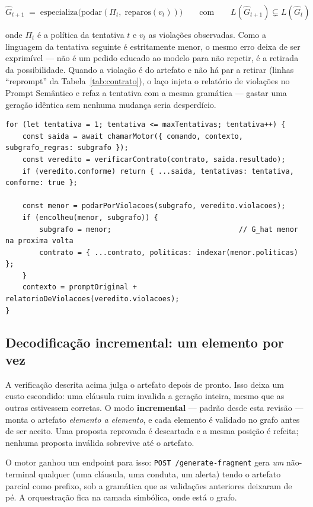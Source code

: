 \documentclass[11pt,a4paper]{article}
\begin{document}
\begin{equation*}
\hat{G}_{t+1} \;=\; \text{especializa}\bigl(\text{podar}(\Pi_t,\; \text{reparos}(v_t))\bigr)
\qquad\text{com}\qquad L(\hat{G}_{t+1}) \subsetneq L(\hat{G}_t)
\end{equation*}

onde $\Pi_t$ é a política da tentativa $t$ e $v_t$ as violações observadas. Como
a linguagem da tentativa seguinte é estritamente menor, o mesmo erro deixa de
ser exprimível --- não é um pedido educado ao modelo para não repetir, é a
retirada da possibilidade. Quando a violação é do artefato e não há par a
retirar (linhas ``reprompt'' da Tabela~\ref{tab:contrato}), o laço injeta o
relatório de violações no Prompt Semântico e refaz a tentativa com a mesma
gramática --- gastar uma geração idêntica sem nenhuma mudança seria desperdício.

\begin{lstlisting}[language=tsx,caption={Núcleo do laço (simplificado).}]
for (let tentativa = 1; tentativa <= maxTentativas; tentativa++) {
    const saida = await chamarMotor({ comando, contexto, subgrafo_regras: subgrafo });
    const veredito = verificarContrato(contrato, saida.resultado);
    if (veredito.conforme) return { ...saida, tentativas: tentativa, conforme: true };

    const menor = podarPorViolacoes(subgrafo, veredito.violacoes);
    if (encolheu(menor, subgrafo)) {
        subgrafo = menor;                              // G_hat menor na proxima volta
        contrato = { ...contrato, politicas: indexar(menor.politicas) };
    }
    contexto = promptOriginal + relatorioDeViolacoes(veredito.violacoes);
}
\end{lstlisting}

\subsection{Decodificação incremental: um elemento por vez}
\label{sec:incremental}

A verificação descrita acima julga o artefato depois de pronto. Isso deixa um
custo escondido: uma cláusula ruim invalida a geração inteira, mesmo que as
outras estivessem corretas. O modo \textbf{incremental} --- padrão desde esta
revisão --- monta o artefato \emph{elemento a elemento}, e cada elemento é
validado no grafo antes de ser aceito. Uma proposta reprovada é descartada e a
mesma posição é refeita; nenhuma proposta inválida sobrevive até o artefato.

O motor ganhou um endpoint para isso: \texttt{POST /generate-fragment} gera
\emph{um} não-terminal qualquer (uma cláusula, uma conduta, um alerta) tendo o
artefato parcial como prefixo, sob a gramática que as validações anteriores
deixaram de pé. A orquestração fica na camada simbólica, onde está o grafo.
\end{document}
